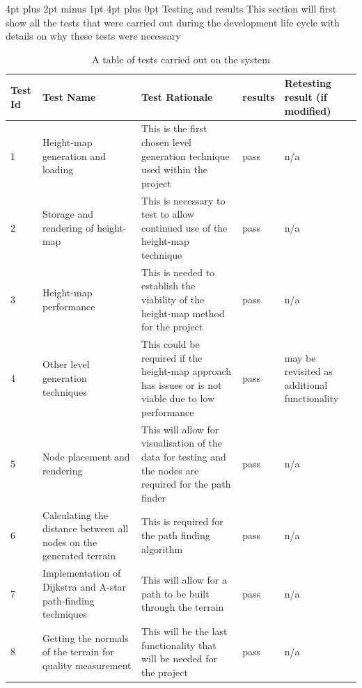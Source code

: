 \documentclass[12pt,a4paper]{article}
\makeatletter
\renewcommand\section{\@startsection {section}{1}{0mm} %
                               {4pt plus 2pt minus 1pt} %
                               {4pt plus 0pt} %
                               {\bfseries}}
\makeatother
\begin{document}
\section{Testing and results}
This section will first show all the tests that were carried out during the development life cycle with details on why these tests were necessary 
\begin{table}[h!]
\begin{tabular}{|p{0.8cm}|p{2cm}|p{5cm}|p{1.4cm}|p{2cm}|}
\hline
Test Id & Test Name & Test Rationale & results & Retesting result (if modified) \\
\hline
1 & Height-map generation and loading & This is the first chosen level generation technique used within the project & pass & n/a\\
\hline
2 & Storage and rendering of height-map & This is necessary to test to allow continued use of the height-map technique & pass & n/a\\
\hline
3 & Height-map performance & This is needed to establish the viability of the height-map method for the project & pass & n/a\\ 
\hline
4 & Other level generation techniques & This could be required if the height-map approach has issues or is not viable due to low performance & pass & may be revisited as additional functionality\\
\hline
5 & Node placement and rendering & This will allow for visualisation of the data for testing and the nodes are required for the path finder & pass & n/a\\ 
\hline
6 & Calculating the distance between all nodes on the generated terrain  & This is required for the path finding algorithm & pass & n/a\\
\hline
7 & Implementation of Dijkstra and A-star path-finding techniques &This will allow for a path to be built through the terrain & pass & n/a\\
\hline
8 & Getting the normals of the terrain for quality measurement& This will be the last functionality that will be needed for the project & pass & n/a\\
\hline
  
\end{tabular} 
\caption{A table of tests carried out on the system}
\end{table}
\newpage
\end{document}
